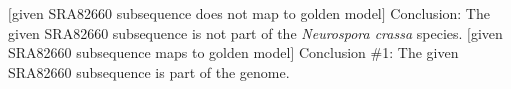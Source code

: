 \documentclass[letter,12pt]{article}
\begin{document}
\begin{codebox}
\label{lst:SRA82660notNeurosporacrassa}
\zi {}
\li	\If $[$given SRA82660 subsequence does not map to golden model$]$
	\Then
\li		Conclusion: The given SRA82660 subsequence is not part of the {\it Neurospora crassa} species.
\li	\ElseIf $[$given SRA82660 subsequence maps to golden model$]$
	\Then
\li		Conclusion \#1: The given SRA82660 subsequence is part of the genome.
	\End
\li	\Return
\end{codebox}


















%
%
%

{\linespread{1}

%

}
\end{document}

